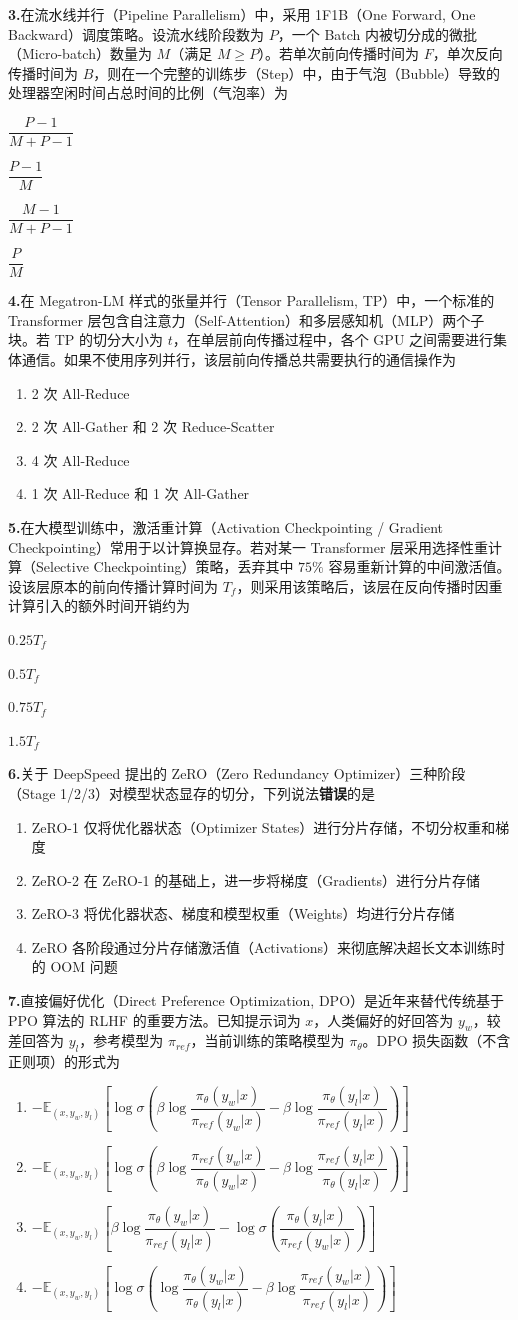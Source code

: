 \documentclass[11pt,a4paper]{article}
\newcommand{\qitem}[2]{%
  \noindent\textbf{#1.}\;#2\par
  \vspace{0.3em}
}
\newcommand{\fourchoices}[4]{%
  \begin{enumerate}[label=(\Alph*),leftmargin=2.2em,itemsep=0pt,parsep=0pt,topsep=0pt]
    \setlength{\itemindent}{0pt}
    \item #1
    \item #2
    \item #3
    \item #4
  \end{enumerate}
  \vspace{0.4em}
}
\newcommand{\fourchoicestwo}[4]{%
  \noindent
  \begin{minipage}[t]{0.5\linewidth}\makebox[2.2em][l]{(A)}#1\end{minipage}%
  \begin{minipage}[t]{0.5\linewidth}\makebox[2.2em][l]{(B)}#2\end{minipage}\par
  \noindent
  \begin{minipage}[t]{0.5\linewidth}\makebox[2.2em][l]{(C)}#3\end{minipage}%
  \begin{minipage}[t]{0.5\linewidth}\makebox[2.2em][l]{(D)}#4\end{minipage}\par
  \vspace{0.4em}
}
\begin{document}
\qitem{3}{在流水线并行（Pipeline Parallelism）中，采用 1F1B（One Forward, One Backward）调度策略。设流水线阶段数为 $P$，一个 Batch 内被切分成的微批（Micro-batch）数量为 $M$（满足 $M \ge P$）。若单次前向传播时间为 $F$，单次反向传播时间为 $B$，则在一个完整的训练步（Step）中，由于气泡（Bubble）导致的处理器空闲时间占总时间的比例（气泡率）为}{}
\fourchoicestwo{$\dfrac{P-1}{M+P-1}$}{$\dfrac{P-1}{M}$}{$\dfrac{M-1}{M+P-1}$}{$\dfrac{P}{M}$}
\newpage

\qitem{4}{在 Megatron-LM 样式的张量并行（Tensor Parallelism, TP）中，一个标准的 Transformer 层包含自注意力（Self-Attention）和多层感知机（MLP）两个子块。若 TP 的切分大小为 $t$，在单层前向传播过程中，各个 GPU 之间需要进行集体通信。如果不使用序列并行，该层前向传播总共需要执行的通信操作为}{}
\fourchoices{2 次 All-Reduce}{2 次 All-Gather 和 2 次 Reduce-Scatter}{4 次 All-Reduce}{1 次 All-Reduce 和 1 次 All-Gather}

\qitem{5}{在大模型训练中，激活重计算（Activation Checkpointing / Gradient Checkpointing）常用于以计算换显存。若对某一 Transformer 层采用选择性重计算（Selective Checkpointing）策略，丢弃其中 $75\%$ 容易重新计算的中间激活值。设该层原本的前向传播计算时间为 $T_f$，则采用该策略后，该层在反向传播时因重计算引入的额外时间开销约为}{}
\fourchoicestwo{$0.25 T_f$}{$0.5 T_f$}{$0.75 T_f$}{$1.5 T_f$}

\qitem{6}{关于 DeepSpeed 提出的 ZeRO（Zero Redundancy Optimizer）三种阶段（Stage 1/2/3）对模型状态显存的切分，下列说法\textbf{错误}的是}{}
\fourchoices{ZeRO-1 仅将优化器状态（Optimizer States）进行分片存储，不切分权重和梯度}{ZeRO-2 在 ZeRO-1 的基础上，进一步将梯度（Gradients）进行分片存储}{ZeRO-3 将优化器状态、梯度和模型权重（Weights）均进行分片存储}{ZeRO 各阶段通过分片存储激活值（Activations）来彻底解决超长文本训练时的 OOM 问题}

\qitem{7}{直接偏好优化（Direct Preference Optimization, DPO）是近年来替代传统基于 PPO 算法的 RLHF 的重要方法。已知提示词为 $x$，人类偏好的好回答为 $y_w$，较差回答为 $y_l$，参考模型为 $\pi_{ref}$，当前训练的策略模型为 $\pi_{\theta}$。DPO 损失函数（不含正则项）的形式为}{}
\fourchoices{$-\mathbb{E}_{(x, y_w, y_l)} \left[ \log \sigma \left( \beta \log \dfrac{\pi_\theta(y_w|x)}{\pi_{ref}(y_w|x)} - \beta \log \dfrac{\pi_\theta(y_l|x)}{\pi_{ref}(y_l|x)} \right) \right]$}{$-\mathbb{E}_{(x, y_w, y_l)} \left[ \log \sigma \left( \beta \log \dfrac{\pi_{ref}(y_w|x)}{\pi_\theta(y_w|x)} - \beta \log \dfrac{\pi_{ref}(y_l|x)}{\pi_\theta(y_l|x)} \right) \right]$}{$-\mathbb{E}_{(x, y_w, y_l)} \left[ \beta \log \dfrac{\pi_\theta(y_w|x)}{\pi_{ref}(y_l|x)} - \log \sigma \left( \dfrac{\pi_\theta(y_l|x)}{\pi_{ref}(y_w|x)} \right) \right]$}{$-\mathbb{E}_{(x, y_w, y_l)} \left[ \log \sigma \left( \log \dfrac{\pi_\theta(y_w|x)}{\pi_\theta(y_l|x)} - \beta \log \dfrac{\pi_{ref}(y_w|x)}{\pi_{ref}(y_l|x)} \right) \right]$}
\end{document}
